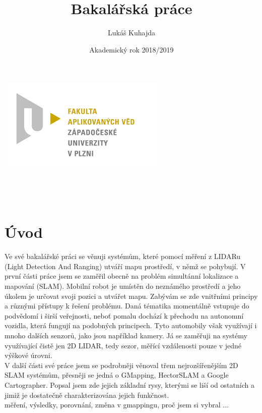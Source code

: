 \documentclass[12pt]{article}
\begin{document}
\title{Bakalářská práce}
\author{Lukáš Kuhajda}
\date{Akademický rok 2018/2019}
\begin{titlepage}
	\begin{center}
		\includegraphics[scale=0.5]{logo_zcu}\\
		\vspace{5cm}
		\begin{Large}
			\textbf{\thetitle}\\
		\end{Large}
		
		\vspace{3cm}
		\theauthor\\
		\vspace{5cm}
		\thedate
	\end{center}
\end{titlepage}
\newpage	
	
\tableofcontents
\newpage





\section{Úvod}
Ve své bakalářské práci se věnuji systémům, které pomocí měření z LIDARu (Light Detection And Ranging) utváří mapu prostředí, v němž se pohybují. V první části práce jsem se zaměřil obecně na problém simultánní lokalizace a mapování (SLAM). Mobilní robot je umístěn do neznámého prostředí a jeho úkolem je určovat svoji pozici a utvářet mapu. Zabývám se zde vnitřními principy a různými přístupy k řešení problému. Daná tématika momentálně vstupuje do podvědomí i širší veřejnosti, neboť pomalu dochází k přechodu na autonomní vozidla, která fungují na podobných principech. Tyto automobily však využívají i mnoho dalších senzorů, jako jsou například kamery. Já se zaměřuji na systémy využívající čistě jen 2D LIDAR, tedy sezor, měřící vzdálenosti pouze v jedné výškové úrovni.\\
\indent V další části své práce jsem se podrobněji věnoval třem nejrozšířenějším 2D SLAM systémům, přesněji se jedná o GMapping, HectorSLAM a Google Cartographer. Popsal jsem zde jejich základní rysy, kterými se liší od ostatních a jimiž je dostatečně charakterizována jejich funkčnost. \\
\indent měření, výsledky, porovnání, změna v gmappingu, proč jsem si vybral ...
\end{document}
